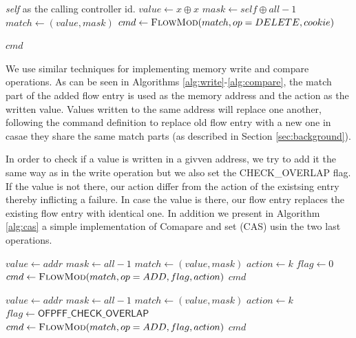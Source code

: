 \documentclass[conference]{sigcomm-alternate}
\newcommand{\concat}[0]{\oplus}
\newcommand{\compare}{compare\xspace}
\begin{document}
\begin{algorithm}[t]
    \caption{$\textit{unclaim}(x)$}
    \label{alg:unclaim}
    \begin{algorithmic}[1]
    \Require \emph{self} as the calling controller id.
    		\State $value \gets x\concat x$
    		\State $mask \gets self\concat all-1$
    		\State $match \gets (value,mask)$
    		\State $cmd\gets \textsc{FlowMod}(match, op=DELETE, cookie) $
    	
			
			\Return $cmd$
    \end{algorithmic}
\end{algorithm}


We use similar techniques for implementing memory write and \compare 
 operations.
 As can be seen in Algorithms \ref{alg:write}-\ref{alg:compare}, 
  the match part of the added flow entry is used as the memory address and the action as the written value. Values written to the same address will replace one another, following the command definition to replace old flow entry with a new one in casae they share the same match parts (as described in Section \ref{sec:background}).
  
In order to check if a value is written in a givven address, we try to add it the same way as in the write operation  but we also set the \textsf{CHECK\_OVERLAP} flag. If the value is not there, our action differ from the action of the existsing entry thereby inflicting a failure.
In case the value is there, our flow entry replaces the existing flow entry with identical one.
In addition we present in Algorithm \ref{alg:cas} a simple implementation of Comapare and set (CAS) usin the two last operations.

\begin{algorithm}[t]
    \caption{$\textit{write}(addr,k)$}
    \label{alg:write}
    \begin{algorithmic}[1]
    		\State $value \gets addr$
    		\State $mask \gets  all-1$
    		\State $match \gets (value,mask)$
    		\State $action \gets k$
    		\State $flag \gets 0$
    		\State $cmd\gets \textsc{FlowMod}(match, op = ADD, flag, action) $
			\Return $cmd$
    \end{algorithmic}
\end{algorithm}

\begin{algorithm}[t]
    \caption{$\textit{\compare}(addr,k)$}
    \label{alg:compare}
    \begin{algorithmic}[1]
    		\State $value \gets addr$
    		\State $mask \gets  all-1$
    		\State $match \gets (value,mask)$
    		\State $action \gets k$
    		\State $flag \gets \textsf{OFPFF\_CHECK\_OVERLAP}$
    		\State $cmd\gets \textsc{FlowMod}(match, op = ADD, flag, action) $
			\Return $cmd$
    \end{algorithmic}
\end{algorithm}
\end{document}
